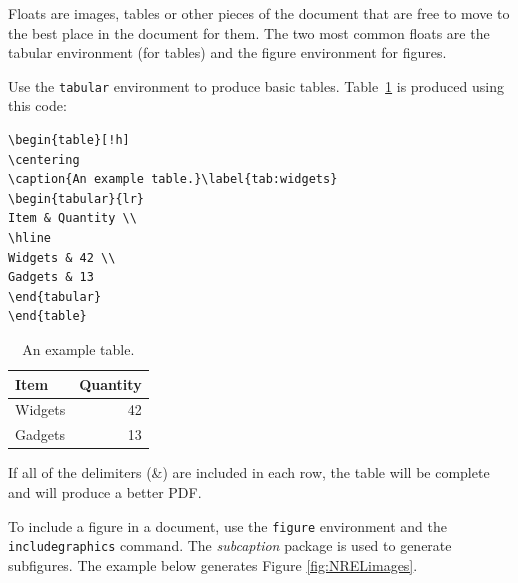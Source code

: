 Floats are images, tables or other pieces of the document that are free to move to the best place in the document for them. The two most common floats are the tabular environment (for tables) and the figure environment for figures.

Use the \texttt{tabular} environment to produce basic tables. Table~\ref{tab:widgets} is produced using this code: 

\begin{lstlisting}
\begin{table}[!h]
\centering
\caption{An example table.}\label{tab:widgets}
\begin{tabular}{lr}
Item & Quantity \\
\hline
Widgets & 42 \\
Gadgets & 13
\end{tabular}
\end{table}
\end{lstlisting}

\begin{table}[!h]
\centering
\caption{An example table.}\label{tab:widgets}
\begin{tabular}{lr}
Item & Quantity \\
\hline
Widgets & 42 \\
Gadgets & 13
\end{tabular}
\end{table}

If all of the delimiters (\&) are included in each row, the table will be complete and will produce a better PDF.

To include a figure in a document, use the \texttt{figure} environment and the \texttt{includegraphics} command. The \emph{subcaption} package is used to generate subfigures. The example below generates Figure \ref{fig:NRELimages}.

